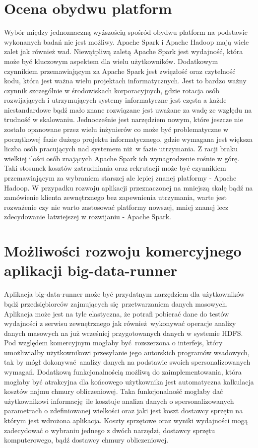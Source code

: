 \section{Ocena obydwu platform}
Wybór między jednoznaczną wyższością spośród obydwu platform na podstawie wykonanych badań nie jest możliwy. Apache Spark i Apache Hadoop mają wiele zalet jak również wad. Niewątpliwą zaletą Apache Spark jest wydajność, która może być kluczowym aspektem dla wielu użytkowników. Dodatkowym czynnikiem przemawiającym za Apache Spark jest zwięzłość oraz czytelność kodu, która jest ważna wielu projektach informatycznych. Jest to bardzo ważny czynnik szczególnie w środowiskach korporacyjnych, gdzie rotacja osób rozwijających i utrzymujących systemy informatyczne jest częsta a każde niestandardowe bądź mało znane rozwiązane jest uważane za wadę ze względu na trudność w skalowaniu. Jednocześnie jest narzędziem nowym, które jeszcze nie zostało opanowane przez wielu inżynierów co może być problematyczne w początkowej fazie dużego projektu informatycznego, gdzie wymagana jest większa liczba osób pracujących nad systemem niż w fazie utrzymania. Z racji braku wielkiej ilości osób znających Apache Spark ich wynagrodzenie rośnie w górę. Taki stosunek kosztów zatrudniania oraz rekrutacji może być czynnikiem przemawiającym za wybraniem starszej ale lepiej znanej platformy - Apache Hadoop. W przypadku rozwoju aplikacji przeznaczonej na mniejszą skalę bądź na zamówienie klienta zewnętrznego bez zapewnienia utrzymania, warte jest rozważenie czy nie warto zastosować platformy nowszej, mniej znanej lecz zdecydowanie łatwiejszej w rozwijaniu - Apache Spark.
\section{Możliwości rozwoju komercyjnego aplikacji big-data-runner}
Aplikacja big-data-runner może być przydatnym narzędziem dla użytkowników bądź przedsiębiorców zajmujących się przetwarzaniem danych masowych. Aplikacja może jest na tyle elastyczna, że potrafi pobierać dane do testów wydajności z serwisu zewnętrznego jak również wykonywać operacje analizy danych masowych na już wcześniej przygotowanych danych w systemie HDFS. Pod względem komercyjnym mogłaby być rozszerzona o interfejs, który umożliwiałby użytkownikowi przesyłanie jego autorskich programów wsadowych, tak by mógł dokonywać analizy danych na podstawie swoich spersonalizowanych wymagań. Dodatkową funkcjonalnością możliwą do zaimplementowania, która mogłaby być atrakcyjna dla końcowego użytkownika jest automatyczna kalkulacja kosztów najmu chmury obliczeniowej. Taka funkcjonalność mogłaby dać użytkownikowi informację ile kosztuje analiza danych o spersonalizowanych parametrach o zdefiniowanej wielkości oraz jaki jest koszt dostawcy sprzętu na którym jest wdrożona aplikacja. Koszty sprzętowe oraz wyniki wydajności mogą zadecydować o wybraniu jednego z dwóch narzędzi, dostawcy sprzętu komputerowego, bądź dostawcy chmury obliczeniowej.